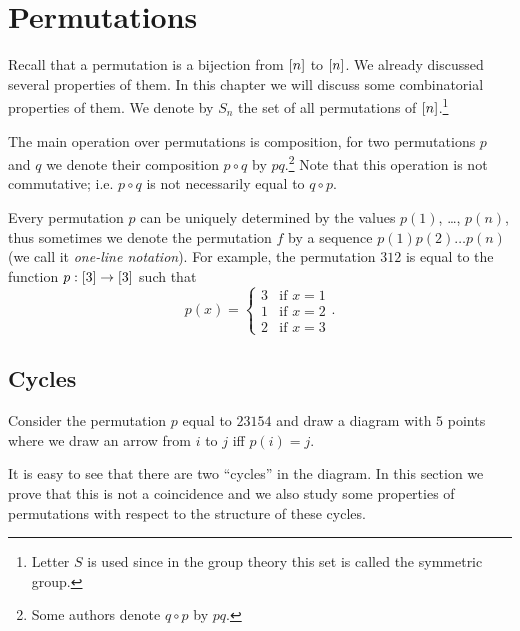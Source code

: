 \chapter{Permutations}
\label{chapter:permutations}
Recall that a permutation is a bijection from ${[{n}]}$ to ${[{n}]}$. We already
discussed several properties of them. In this chapter we will discuss some
combinatorial properties of them. We denote by $S_n$ the set of all
permutations of ${[{n}]}$.\footnote{%
  Letter $S$ is used since in the group theory this set is called
  the symmetric group.
}


The main operation over permutations is composition, for two permutations $p$
and $q$ we denote their composition $p \circ q$ by $pq$.\footnote{%
  Some authors denote $q \circ p$ by $pq$.
}
Note that this operation is not commutative; i.e. $p \circ q$ is not
necessarily equal to $q \circ p$.

Every permutation $p$ can be uniquely determined by the values $p(1)$, \dots,
$p(n)$, thus sometimes we denote the permutation $f$ by a sequence
$p(1) p(2) \dots p(n)$ (we call it \emph{one-line notation}).
For example, the permutation $3 1 2$ is equal to the function $p : {[{3}]} \to
{[{3}]}$
such that
\[
  p(x) =
  \begin{cases}
    3 & \text{if } x = 1 \\
    1 & \text{if } x = 2 \\
    2 & \text{if } x = 3
  \end{cases}.
\]


\section{Cycles}
Consider the permutation $p$ equal to $2 3 1 5 4$ and draw a diagram with
$5$ points where we draw an arrow from $i$ to $j$ iff $p(i) = j$.
\begin{center}
\end{center}
It is easy to see that there are two ``cycles'' in the diagram. In this section
we prove that this is not a coincidence and we also study some properties of
permutations with respect to the structure of these cycles.

